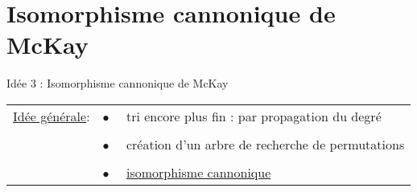 \section{Isomorphisme cannonique de McKay}

\begin{frame}{Idée 3 : Isomorphisme cannonique de McKay}
    \begin{tabular}{ll}
    \underline{Idée générale}: & $\bullet \quad$ tri encore plus fin : par propagation du degré \\ \\
    & $\bullet \quad$ création d'un arbre de recherche de permutations \\ \\
    & $\bullet \quad$ \underline{isomorphisme cannonique}
    \end{tabular}
\end{frame}

